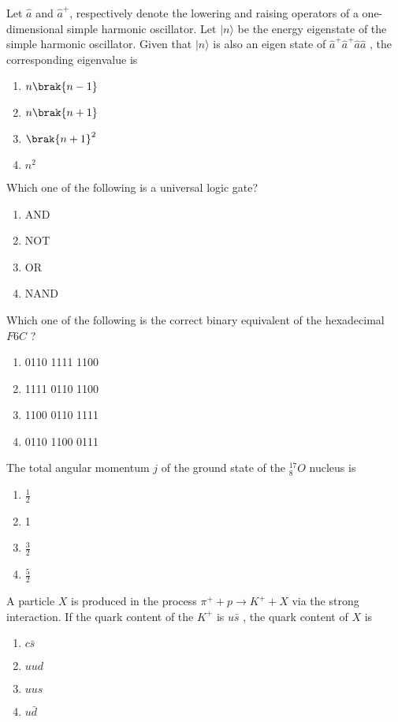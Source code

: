 	\item Let $\hat{a}$ and $\hat{a}^{+}$, respectively denote the lowering and raising operators of a one-dimensional simple harmonic oscillator. Let $|n\rangle$ be the energy eigenstate of the simple harmonic oscillator. Given that $|n\rangle$ is also an eigen state of $\hat{a}^{+}\hat{a}^{+}\hat{a}\hat{a}$ , the corresponding eigenvalue is
		\begin{enumerate}
	\item $n\brak{n-1}$
	\item $n\brak{n+1}$
	\item $\brak{n+1}^2$
	\item $n^2$
		\end{enumerate}
	\item Which one of the following is a universal logic gate?
		\begin{enumerate}
			\item AND
			\item NOT
			\item OR
			\item NAND
		\end{enumerate}
	\item Which one of the following is the correct binary equivalent of the hexadecimal $F6C$ ?
		\begin{enumerate}
			\item 0110 1111 1100 
			\item 1111 0110 1100
			\item 1100 0110 1111
			\item 0110 1100 0111
		\end{enumerate}
	\item The total angular momentum $j$ of the ground state of the $^{17}_{8}O$ nucleus is
		\begin{enumerate}
			\item $\frac{1}{2}$
			\item 1
			\item $\frac{3}{2}$
			\item $\frac{5}{2}$
		\end{enumerate}
	\item A particle $X$ is produced in the process $\pi ^{+}+p \to K^{+}+X$ via the strong interaction. If the quark content of the $K^{+}$ is $u\bar{s}$ , the quark content of $X$ is
		\begin{enumerate}
			\item $c\bar{s}$
			\item $uud$
			\item $uus$
			\item $u\bar{d}$
		\end{enumerate}
